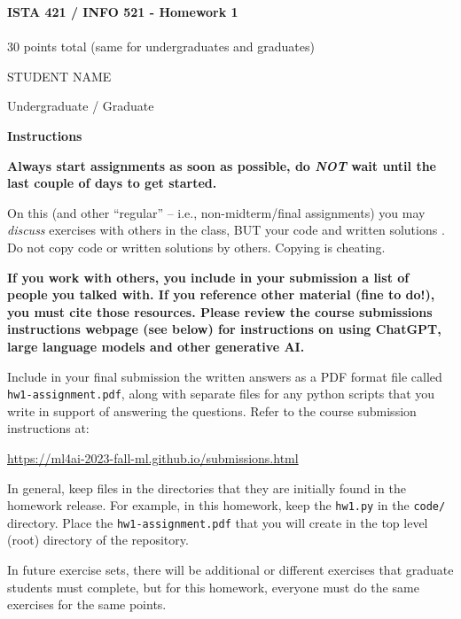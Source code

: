 \documentclass[10pt]{article}
\begin{document}
\begin{center}
    {\Large {\bf ISTA 421 / INFO 521 - Homework 1}} \\
     \\
    30 points total (same for undergraduates and graduates) \\
    \vspace{1cm}
\end{center}

\begin{flushright}
STUDENT NAME  %

Undergraduate / Graduate %
\end{flushright}

\vspace{1cm}

{\Large {\bf Instructions}}

{\bf Always start assignments as soon as possible, do {\em NOT} wait until the last couple of days to get started.}

On this (and other ``regular'' -- i.e., non-midterm/final assignments) you may {\em discuss} exercises with others in the class, BUT your code and written solutions .  Do not copy code or written solutions by others. Copying is cheating.

{\bf If you work with others, you  include in your submission a list of people you talked with.  If you reference other material (fine to do!), you must cite those resources. Please review the course submissions instructions webpage (see below) for instructions on using ChatGPT, large language models and other generative AI.}

Include in your final submission the written answers as a PDF format file called {\tt hw1-assignment.pdf}, along with separate files for any python scripts that you write in support of answering the questions. 
Refer to the course submission instructions at:
\begin{center}
\url{https://ml4ai-2023-fall-ml.github.io/submissions.html}
\end{center}
In general, keep files in the directories that they are initially found in the homework release. For example, in this homework, keep the {\tt hw1.py} in the {\tt code/} directory. Place the {\tt hw1-assignment.pdf} that you will create in the top level (root) directory of the repository.

In future exercise sets, there will be additional or different exercises that graduate students must complete, but for this homework, everyone must do the same exercises for the same points.
\end{document}

